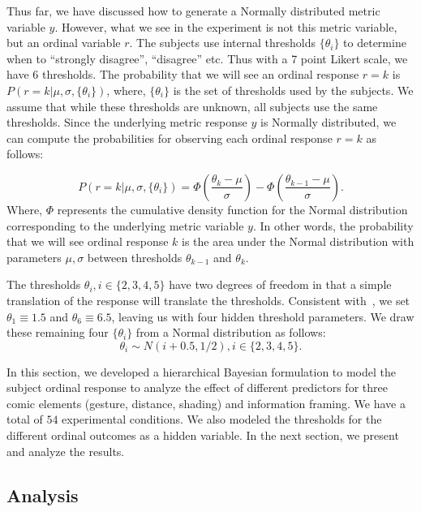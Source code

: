Thus far, we have discussed how to generate a Normally distributed metric variable $y$. However, what we see in the experiment is not this metric variable, but an ordinal variable $r$. The subjects use internal thresholds $\{\theta_i\}$ to determine when to ``strongly disagree'', ``disagree'' etc. Thus with a 7 point Likert scale, we have 6 thresholds. The probability that we will see an ordinal response $r=k$ is $P(r=k | \mu, \sigma, \{\theta_i\})$, where, $\{\theta_i\}$ is the set of thresholds used by the subjects. We assume that while these thresholds are unknown, all subjects use the same thresholds. Since the underlying metric response $y$ is Normally distributed, we can compute the probabilities for observing each ordinal response $r=k$ as follows:

\begin{equation}
 P(r=k | \mu, \sigma, \{\theta_i\}) = \Phi \left (\frac{\theta_k - \mu}{\sigma} \right) - \Phi \left(\frac{\theta_{k-1} - \mu}{\sigma} \right).
\end{equation}
Where, $\Phi$ represents the cumulative density function for the Normal distribution corresponding to the underlying metric variable $y$. In other words, the probability that we will see ordinal response $k$ is the area under the Normal distribution with parameters $\mu, \sigma$ between thresholds $\theta_{k-1}$ and $\theta_k$.

The thresholds $\theta_i, i \in \{2, 3, 4, 5\}$ have two degrees of freedom in that a simple translation of the response will translate the thresholds. Consistent with~\textcite[][p. 674]{Kruschke2014}, we set $\theta_1\equiv1.5$ and $\theta_6\equiv6.5$, leaving us with four hidden threshold parameters. We draw these remaining four $\{ \theta_i\}$ from a Normal distribution as follows:
\begin{equation}
 \theta_i \sim N(i+0.5, 1/2), i \in \{2, 3, 4, 5\}.
\end{equation}

In this section, we developed a hierarchical Bayesian formulation to model the subject ordinal response to analyze the effect of different predictors for three comic elements (gesture, distance, shading) and information framing. We have a total of $54$ experimental conditions. We also modeled the thresholds for the different ordinal outcomes as a hidden variable. In the next section, we present and analyze the results.

\subsection{Analysis}
\label{sub:Analysis}

